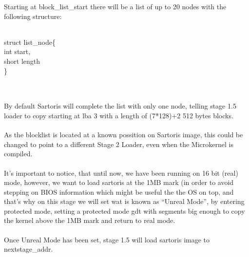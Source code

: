 \documentclass[11pt, letterpaper, twoside, english]{book}
\begin{document}
Starting at \textsf{block\_list\_start} there will be a list of up to 20 nodes with the following structure:
\\
\\
\begin{sf} 
\noindent struct list\_node\{\\
\indent int start,\\
\indent short length\\
\noindent \}\\
\end{sf}\\
\\
By default Sartoris will complete the list with only one node, telling stage 1.5 loader to copy starting at lba 3 with a length of (7*128)+2 512 bytes blocks.\\
\\
As the blocklist is located at a known possition on Sartoris image, this could be changed to point to a different Stage 2 Loader, even when the Microkernel is compiled.\\
\\
It's important to notice, that until now, we have been running on 16 bit (real) mode, however, we want to load sartoris at the 1MB mark (in order to avoid stepping on BIOS information which might be useful the the OS on top, and that's why on this stage we will set wat is known as "`Unreal Mode"', by entering protected mode, setting a protected mode gdt with segments big enough to copy the kernel above the 1MB mark and return to real mode.\\
\\
Once Unreal Mode has been set, stage 1.5 will load sartoris image to \textsf{nextstage\_addr}.\\
\end{document}
